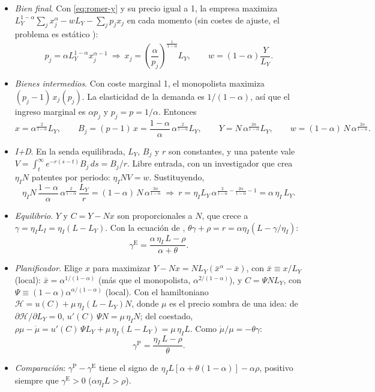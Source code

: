\documentclass[11pt]{article}
\begin{document}
\begin{itemize}
\item \emph{Bien final}. Con \eqref{eq:romer-y} y su precio igual a 1, la empresa maximiza $L_Y^{1-\alpha}\sum_jx_j^{\alpha}-wL_Y-\sum_jp_jx_j$ en cada momento (sin costes de ajuste, el problema es estático ):
  \[p_j=\alpha L_Y^{1-\alpha}x_j^{\alpha-1}\ \Longrightarrow\ x_j=\left(\frac{\alpha}{p_j}\right)^{\frac{1}{1-\alpha}}L_Y,\qquad w=(1-\alpha)\frac{Y}{L_Y}.\]
\item \emph{Bienes intermedios}. Con coste marginal 1, el monopolista maximiza $(p_j-1)\,x_j(p_j)$. La elasticidad de la demanda es $1/(1-\alpha)$, así que el ingreso marginal es $\alpha p_j$ y $p_j=p=1/\alpha$. Entonces
  \[x=\alpha^{\frac{2}{1-\alpha}}L_Y,\qquad B_j=(p-1)\,x=\frac{1-\alpha}{\alpha}\,\alpha^{\frac{2}{1-\alpha}}L_Y,\qquad Y=N\,\alpha^{\frac{2\alpha}{1-\alpha}}L_Y,\qquad w=(1-\alpha)\,N\,\alpha^{\frac{2\alpha}{1-\alpha}}.\]
\item \emph{I+D}. En la senda equilibrada, $L_Y$, $B_j$ y $r$ son constantes, y una patente vale $V=\int_t^{\infty}e^{-r(s-t)}B_j\,ds=B_j/r$. Libre entrada, con un investigador que crea $\eta_IN$ patentes por periodo: $\eta_INV=w$. Sustituyendo,
  \[\eta_I N\,\frac{1-\alpha}{\alpha}\,\alpha^{\frac{2}{1-\alpha}}\,\frac{L_Y}{r}=(1-\alpha)\,N\,\alpha^{\frac{2\alpha}{1-\alpha}}\ \Longrightarrow\ r=\eta_IL_Y\,\alpha^{\frac{2}{1-\alpha}-\frac{2\alpha}{1-\alpha}-1}=\alpha\,\eta_I\,L_Y.\]
\item \emph{Equilibrio}. $Y$ y $C=Y-Nx$ son proporcionales a $N$, que crece a $\gamma=\eta_IL_I=\eta_I(L-L_Y)$. Con la ecuación de , $\theta\gamma+\rho=r=\alpha\eta_I(L-\gamma/\eta_I)$:
  \[\gamma^{\mathrm E}=\frac{\alpha\,\eta_I\,L-\rho}{\alpha+\theta}.\]
\item \emph{Planificador}. Elige $x$ para maximizar $Y-Nx=NL_Y(\bar x^{\alpha}-\bar x)$, con $\bar x\equiv x/L_Y$ (local): $\bar x=\alpha^{1/(1-\alpha)}$ (más que el monopolista, $\alpha^{2/(1-\alpha)}$), y $C=\Psi NL_Y$, con $\Psi\equiv(1-\alpha)\alpha^{\alpha/(1-\alpha)}$ (local). Con el hamiltoniano $\mathcal H=u(C)+\mu\,\eta_I(L-L_Y)N$, donde $\mu$ es el precio sombra de una idea: de $\partial\mathcal H/\partial L_Y=0$, $u'(C)\,\Psi N=\mu\,\eta_IN$; del coestado, $\rho\mu-\dot\mu=u'(C)\,\Psi L_Y+\mu\,\eta_I(L-L_Y)=\mu\,\eta_IL$. Como $\dot\mu/\mu=-\theta\gamma$:
  \[\gamma^{\mathrm P}=\frac{\eta_I\,L-\rho}{\theta}.\]
\item \emph{Comparación}: $\gamma^{\mathrm P}-\gamma^{\mathrm E}$ tiene el signo de $\eta_IL[\alpha+\theta(1-\alpha)]-\alpha\rho$, positivo siempre que $\gamma^{\mathrm E}>0$ ($\alpha\eta_IL>\rho$). \findemo
\end{itemize}
\end{document}
